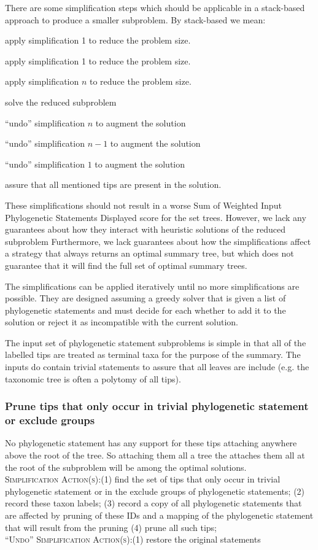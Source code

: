 \documentclass[11pt]{article}
\newcommand{\ps}{phylogenetic statement\xspace}
\newcommand{\pss}{phylogenetic statements\xspace}
\newcommand{\PSs}{Phylogenetic Statements\xspace}
\newcommand{\SWIPSD}{Sum of Weighted Input \PSs Displayed\xspace}
\newcommand{\simplification}[0]{\\\noindent\textsc{Simplification Action(s)}:\xspace}
\newcommand{\undoActions}[0]{\\\noindent\textsc{``Undo'' Simplification Action(s)}:\xspace}
\begin{document}
There are some simplification steps which should be applicable in a stack-based
    approach to produce a smaller subproblem.
By stack-based we mean:
\begin{compactenum}
    \item apply simplification 1 to reduce the problem size.
    \item apply simplification 1 to reduce the problem size.
    \item[$\ldots]
    \item[$n$] apply simplification $n$ to reduce the problem size.
    \item[$n + 1$] solve the reduced subproblem
    \item[$n + 2$]``undo'' simplification $n$ to augment the solution
    \item[$n + 3$] ``undo'' simplification $n-1$ to augment the solution
    \item[$\ldots]
    \item[$2n + 1$] ``undo'' simplification $1$ to augment the solution
    \item[$2n +2$] assure that all mentioned tips are present in the solution.
\end{compactenum}

These simplifications should not result in a worse \SWIPSD score for the set trees.
However, we lack any guarantees about how they interact with heuristic solutions
    of the reduced subproblem 
Furthermore, we lack guarantees about how the simplifications affect a strategy that always
    returns an optimal summary tree, but which does not guarantee that it will
    find the full set of optimal summary trees.

The simplifications can be applied iteratively until no more simplifications are possible.
They are designed assuming a greedy solver that is given a list of \pss and must decide
    for each whether to add it to the solution or reject it as incompatible with the 
    current solution.

The input set of \ps subproblems is simple in that all of the labelled tips are treated
    as terminal taxa for the purpose of the summary.
The inputs do contain trivial statements to assure that all leaves are include (e.g. 
     the taxonomic tree is often a polytomy of all tips).

\subsubsection{Prune tips that only occur in trivial \ps or exclude groups}
No \ps has any support for these tips attaching anywhere above the root of the tree.
So attaching them all a tree the attaches them all at the  root of the subproblem will
    be among the optimal solutions.
\simplification (1) find the set of tips that only occur in trivial \ps or in the exclude
    groups of \pss;
    (2) record these taxon labels;
    (3) record a copy of all \pss that are affected by pruning of these IDs and a mapping
        of the \ps that will result from the pruning
    (4) prune all such tips;
\undoActions (1) restore the original statements
\end{document}
